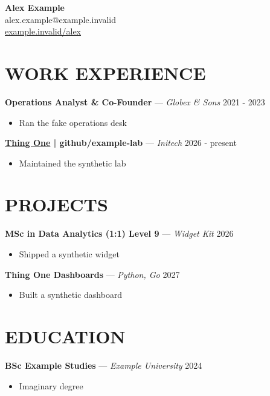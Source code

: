\documentclass[11pt]{article}
\newcommand{\workentry}[4]{%
  \noindent\textbf{#1} --- \textit{#2} \hfill #3\par
  #4
}
\newenvironment{highlights}{\begin{itemize}}{\end{itemize}}
\begin{document}
\begin{center}
  {\LARGE \textbf{Alex Example}}\\[2pt]
  alex.example@example.invalid\\
  \href{https://example.invalid/alex}{example.invalid/alex}
\end{center}

\section*{WORK EXPERIENCE}

\workentry{Operations Analyst \& Co-Founder}{Globex \& Sons}{2021 - 2023}{%
\begin{highlights}
  \item Ran the fake operations desk
\end{highlights}}

\workentry{\href{https://example.invalid/lab}{Thing One} | github/example-lab}{Initech}{2026 - present}{%
\begin{highlights}
  \item Maintained the synthetic lab
\end{highlights}}

\section*{PROJECTS}

\workentry{MSc in Data Analytics (1:1) \texttimes{} Level 9}{Widget Kit}{2026}{%
\begin{highlights}
  \item Shipped a synthetic widget
\end{highlights}}

\workentry{Thing One Dashboards}{Python, Go}{2027}{%
\begin{highlights}
  \item Built a synthetic dashboard
\end{highlights}}

\section*{EDUCATION}

\workentry{BSc Example Studies}{Example University}{2024}{%
\begin{highlights}
  \item Imaginary degree
\end{highlights}}
\end{document}
